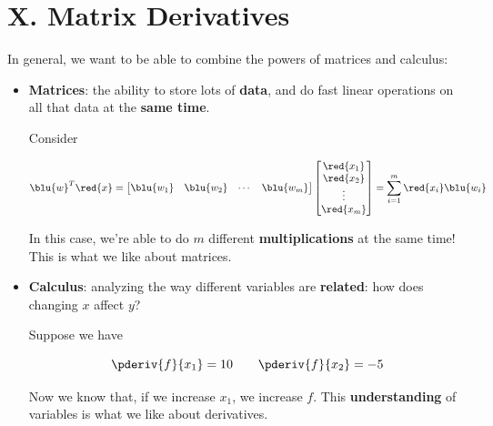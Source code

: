 \section*{X.  Matrix Derivatives}
        
    In general, we want to be able to combine the powers of matrices and calculus:
    
    \begin{itemize}
        \item \textbf{Matrices}: the ability to store lots of \textbf{data}, and do fast linear operations on all that data at the \textbf{same time}.
        
        \miniex Consider
        
        \begin{equation}
            \blu{w}^T\red{x} =
            \begin{bmatrix}
                \blu{w_1} & \blu{w_2} & \cdots & \blu{w_m}
            \end{bmatrix}
            \begin{bmatrix}
                \red{x_1} \\ \red{x_2} \\ \vdots \\ \red{x_m}
            \end{bmatrix}
            =
            \sum_{i=1}^m \red{x_i}\blu{w_i}
        \end{equation}
        
        In this case, we're able to do $m$ different \textbf{multiplications} at the same time! This is what we like about matrices.
        
        \item \textbf{Calculus}: analyzing the way different variables are \textbf{related}: how does changing $x$ affect $y$?
        
        \miniex Suppose we have 
        
        \begin{equation}
            \pderiv{f}{x_1}=10 \qquad 
            \pderiv{f}{x_2}=-5
        \end{equation}
        
        Now we know that, if we increase $x_1$, we increase $f$. This \textbf{understanding} of variables is what we like about derivatives.\\
    \end{itemize}
    
